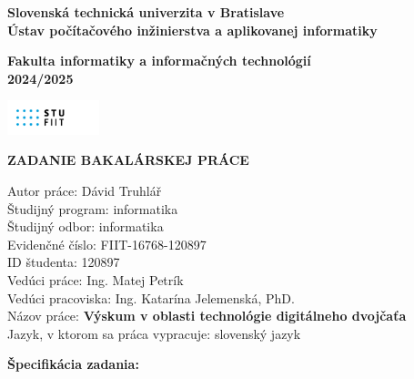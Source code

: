 \documentclass[12pt,a4paper]{article}
\begin{document}
\pagestyle{empty}

\begin{minipage}{0.6\textwidth}
    \raggedright
    \textbf{Slovenská technická univerzita v Bratislave} \\
    \textbf{Ústav počítačového inžinierstva a aplikovanej informatiky}
\end{minipage}%
\hfill
\begin{minipage}{0.35\textwidth}
    \raggedright
    \textbf{Fakulta informatiky a informačných technológií} \\
    \textbf{2024/2025}
\end{minipage}

\vspace{0.25cm}

\begin{center}
    \includegraphics[width=0.2\textwidth]{assets/images/logo-fiit.png}
\end{center}

\vspace{0.25cm}

\begin{center}
    \Large\textbf{ZADANIE BAKALÁRSKEJ PRÁCE}
\end{center}

\vspace{0.25cm}

\noindent
{Autor práce:} Dávid Truhlář \\
{Študijný program:} informatika \\
{Študijný odbor:} informatika \\
{Evidenčné číslo:} FIIT-16768-120897 \\
{ID študenta:} 120897 \\
{Vedúci práce:} Ing. Matej Petrík \\
{Vedúci pracoviska:} Ing. Katarína Jelemenská, PhD. \\
{Názov práce:} \textbf{Výskum v oblasti technológie digitálneho dvojčaťa} \\
{Jazyk, v ktorom sa práca vypracuje:} slovenský jazyk

\vspace{0.5cm}

\noindent
\textbf{Špecifikácia zadania:}
\end{document}
